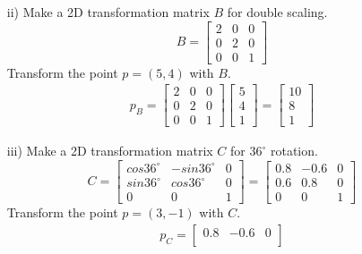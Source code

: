 \begin{itemize}
{    }
    \item[ii)] {
    Make a 2D transformation matrix $B$ for double scaling.
    \begin{equation*}
        B = \begin{bmatrix}
            2 & 0 & 0\\
            0 & 2 & 0\\
            0 & 0 & 1
        \end{bmatrix}
    \end{equation*}
    Transform the point $p=(5,4)$ with $B$.
    \begin{eqnarray*}
        p_B = \begin{bmatrix}
            2 & 0 & 0\\
            0 & 2 & 0\\
            0 & 0 & 1
            \end{bmatrix}
            \begin{bmatrix}
            5\\4\\1
            \end{bmatrix}
            = \begin{bmatrix}
                10\\8\\1
            \end{bmatrix}
    \end{eqnarray*}
    }
    \item[iii)] {
        Make a 2D transformation matrix $C$ for $36^\circ$ rotation.
        \begin{equation}
            C = \begin{bmatrix}
                cos36^{\circ} & -sin36^{\circ} & 0\\
                sin36^{\circ} & cos36^{\circ} & 0\\
                0 & 0 & 1
                \end{bmatrix}
              = \begin{bmatrix}
                0.8 & -0.6 & 0\\
                0.6 & 0.8 & 0\\
                0 & 0 & 1
                \end{bmatrix}
        \end{equation}
        Transform the point $p=(3,-1)$ with $C$.
        \begin{eqnarray*}
            p_C = \begin{bmatrix}
                0.8 & -0.6 & 0\\

\end{bmatrix}
\end{eqnarray*}}
\end{itemize}
